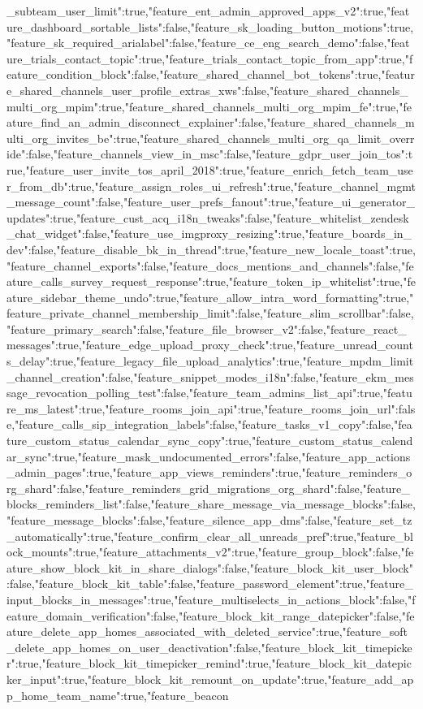 {_subteam_user_limit":true,"feature_ent_admin_approved_apps_v2":true,"feature_dashboard_sortable_lists":false,"feature_sk_loading_button_motions":true,"feature_sk_required_arialabel":false,"feature_ce_eng_search_demo":false,"feature_trials_contact_topic":true,"feature_trials_contact_topic_from_app":true,"feature_condition_block":false,"feature_shared_channel_bot_tokens":true,"feature_shared_channels_user_profile_extras_xws":false,"feature_shared_channels_multi_org_mpim":true,"feature_shared_channels_multi_org_mpim_fe":true,"feature_find_an_admin_disconnect_explainer":false,"feature_shared_channels_multi_org_invites_be":true,"feature_shared_channels_multi_org_qa_limit_override":false,"feature_channels_view_in_msc":false,"feature_gdpr_user_join_tos":true,"feature_user_invite_tos_april_2018":true,"feature_enrich_fetch_team_user_from_db":true,"feature_assign_roles_ui_refresh":true,"feature_channel_mgmt_message_count":false,"feature_user_prefs_fanout":true,"feature_ui_generator_updates":true,"feature_cust_acq_i18n_tweaks":false,"feature_whitelist_zendesk_chat_widget":false,"feature_use_imgproxy_resizing":true,"feature_boards_in_dev":false,"feature_disable_bk_in_thread":true,"feature_new_locale_toast":true,"feature_channel_exports":false,"feature_docs_mentions_and_channels":false,"feature_calls_survey_request_response":true,"feature_token_ip_whitelist":true,"feature_sidebar_theme_undo":true,"feature_allow_intra_word_formatting":true,"feature_private_channel_membership_limit":false,"feature_slim_scrollbar":false,"feature_primary_search":false,"feature_file_browser_v2":false,"feature_react_messages":true,"feature_edge_upload_proxy_check":true,"feature_unread_counts_delay":true,"feature_legacy_file_upload_analytics":true,"feature_mpdm_limit_channel_creation":false,"feature_snippet_modes_i18n":false,"feature_ekm_message_revocation_polling_test":false,"feature_team_admins_list_api":true,"feature_ms_latest":true,"feature_rooms_join_api":true,"feature_rooms_join_url":false,"feature_calls_sip_integration_labels":false,"feature_tasks_v1_copy":false,"feature_custom_status_calendar_sync_copy":true,"feature_custom_status_calendar_sync":true,"feature_mask_undocumented_errors":false,"feature_app_actions_admin_pages":true,"feature_app_views_reminders":true,"feature_reminders_org_shard":false,"feature_reminders_grid_migrations_org_shard":false,"feature_blocks_reminders_list":false,"feature_share_message_via_message_blocks":false,"feature_message_blocks":false,"feature_silence_app_dms":false,"feature_set_tz_automatically":true,"feature_confirm_clear_all_unreads_pref":true,"feature_block_mounts":true,"feature_attachments_v2":true,"feature_group_block":false,"feature_show_block_kit_in_share_dialogs":false,"feature_block_kit_user_block":false,"feature_block_kit_table":false,"feature_password_element":true,"feature_input_blocks_in_messages":true,"feature_multiselects_in_actions_block":false,"feature_domain_verification":false,"feature_block_kit_range_datepicker":false,"feature_delete_app_homes_associated_with_deleted_service":true,"feature_soft_delete_app_homes_on_user_deactivation":false,"feature_block_kit_timepicker":true,"feature_block_kit_timepicker_remind":true,"feature_block_kit_datepicker_input":true,"feature_block_kit_remount_on_update":true,"feature_add_app_home_team_name":true,"feature_beacon}
